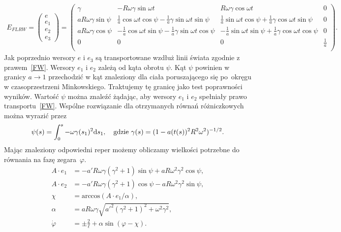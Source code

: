 \begin{align}\nonumber
E_{FLRW} = 
\begin{pmatrix}
e\\
e_1\\
e_2\\
e_3
\end{pmatrix}
=
\begin{pmatrix}
\gamma 	& -R\omega\gamma\sin\omega t 	
& R\omega\gamma\cos\omega t & 0 \\
a R\omega\gamma \sin \psi	
& \frac{1}{a} \cos\omega t \cos\psi - \frac{1}{a}\gamma \sin\omega t \sin\psi
& \frac{1}{a} \sin\omega t \cos\psi + \frac{1}{a}\gamma \cos\omega t \sin\psi
& 0 \\
a R\omega\gamma \cos \psi & -\frac{1}{a} \cos\omega t \sin\psi - 
\frac{1}{a}\gamma \sin\omega t \cos\psi
& -\frac{1}{a} \sin\omega t \sin\psi + 
\frac{1}{a}\gamma \cos\omega t \cos\psi		 & 0 \\
0&	0	& 0	& \frac{1}{a} \\
\end{pmatrix}.
\end{align}
Jak poprzednio wersory $e$ i $e_3$ są transportowane wzdłuż linii świata 
zgodnie z prawem~\eqref{FW}. Wersory $e_1$ i $e_2$ 
zależą od kąta obrotu $\psi$. Kąt $\psi$ powinien w granicy $a\to 1$ 
przechodzić w kąt znaleziony 
dla ciała poruszającego się po~okręgu w czasoprzestrzeni Minkowskiego.
Traktujemy tę granicę jako test poprawności wyników. 
Wartość $\psi$ można znaleźć 
żądając, aby wersory $e_1$ i $e_2$ spełniały prawo transportu~\eqref{FW}. 
Wspólne rozwiązanie dla otrzymanych równań różniczkowych 
można wyrazić przez
\begin{align}\nonumber
\psi(s) =\int_0^s -\omega \gamma(s_1)^2  \text{d} s_1 , \quad 
\text{gdzie } \gamma(s) = (1-a(t(s))^2R^2\omega^2)^{-1/2}.
\end{align}
Mając znaleziony odpowiedni reper możemy obliczamy wielkości
potrzebne do równania na fazę zegara~$\varphi$.
\begin{align*}\nonumber
A\cdot e_1 &= -a'R\omega \gamma \left( \gamma^2+1 \right)\sin\psi
 + a R \omega^2\gamma^2\cos\psi ,       \\
A\cdot e_2 &= -a'R\omega \gamma \left( \gamma^2+1 \right)\cos\psi
 - a R \omega^2 \gamma^2 \sin \psi  ,     \nonumber  \\
\chi & = \text{arccos} \left( A\cdot e_1 / \alpha \right) ,
\\
\alpha & = 
a R \omega \gamma \sqrt{a'^2 \left(\gamma ^2+1\right)^2
 +   \omega^2\gamma^2} ,
\\
\dot{\varphi} &= \pm \frac{2}{\ell} + \alpha \sin (\varphi - \chi) .
\end{align*}
